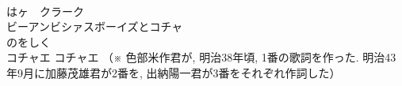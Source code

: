 \documentclass[10pt,b5j]{tarticle} %
\begin{document}
\begin{enumerate}
\begin{minipage}[c]{\blocksize}
        \vspace{\linespace}
        \item~\\
        はヶ　クラーク\\
        ビーアンビシァスボーイズとコチャ\\
        のをしく\\
        コチャエ コチャエ
        （※
        色部米作君が, 明治38年頃, 
        1番の歌詞を作った. 
        明治43年9月に加藤茂雄君が2番を, 
        出納陽一君が3番をそれぞれ作詞した）
    
    \end{minipage}
\end{enumerate} %
\end{document}
